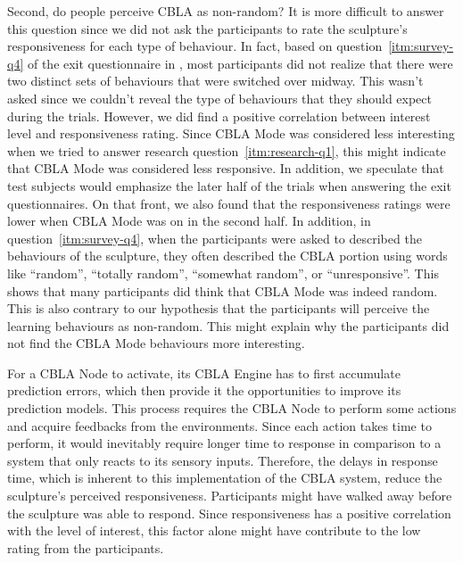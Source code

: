 Second, do people perceive CBLA as non-random? It is more difficult to answer this question since we did not ask the participants to rate the sculpture's responsiveness for each type of behaviour. In fact, based on question~\ref{itm:survey-q4} of the exit questionnaire in , most participants did not realize that there were two distinct sets of behaviours that were switched over midway. This wasn't asked since we couldn't reveal the type of behaviours that they should expect during the trials. However, we did find a positive correlation between interest level and responsiveness rating. Since CBLA Mode was considered less interesting when we tried to answer research question~\ref{itm:research-q1},  this might indicate that CBLA Mode was considered less responsive. In addition, we speculate that test subjects would emphasize the later half of the trials when answering the exit questionnaires. On that front, we also found that the responsiveness ratings were lower when CBLA Mode was on in the second half. In addition, in question~\ref{itm:survey-q4}, when the participants were asked to described the behaviours of the sculpture, they often described the CBLA portion using words like ``random'', ``totally random'', ``somewhat random'', or ``unresponsive''. This shows that many participants did think that CBLA Mode was indeed random. This is also contrary to our hypothesis that the participants will perceive the learning behaviours as non-random. This might explain why the participants did not find the CBLA Mode behaviours more interesting. 

For a CBLA Node to activate, its CBLA Engine has to first accumulate prediction errors, which then provide it the opportunities to improve its prediction models. This process requires the CBLA Node to perform some actions and acquire feedbacks from the environments. Since each action takes time to perform, it would inevitably require longer time to response in comparison to a system that only reacts to its sensory inputs.
Therefore, the delays in response time, which is inherent to this implementation of the CBLA system, reduce the sculpture's perceived responsiveness. Participants might have walked away before the sculpture was able to respond. Since responsiveness has a positive correlation with the level of interest, this factor alone might have contribute to the low rating from the participants.

